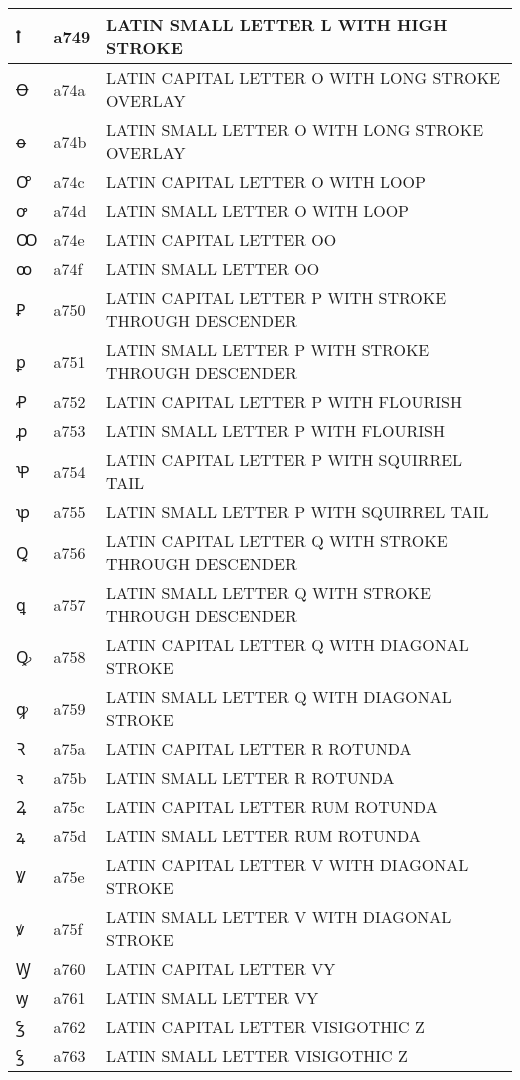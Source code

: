 \documentclass[12pt,letterpaper,openany]{book}
\begin{document}
\begin{center}
\begin{supertabular}{|m{0.25in}|m{0.5in}|m{4in}|}
ꝉ & a749 & LATIN SMALL LETTER L WITH HIGH STROKE\\\hline
Ꝋ & a74a & LATIN CAPITAL LETTER O WITH LONG STROKE OVERLAY\\\hline
ꝋ & a74b & LATIN SMALL LETTER O WITH LONG STROKE OVERLAY\\\hline
Ꝍ & a74c & LATIN CAPITAL LETTER O WITH LOOP\\\hline
ꝍ & a74d & LATIN SMALL LETTER O WITH LOOP\\\hline
Ꝏ & a74e & LATIN CAPITAL LETTER OO\\\hline
ꝏ & a74f & LATIN SMALL LETTER OO\\\hline
Ꝑ & a750 & LATIN CAPITAL LETTER P WITH STROKE THROUGH DESCENDER\\\hline
ꝑ & a751 & LATIN SMALL LETTER P WITH STROKE THROUGH DESCENDER\\\hline
Ꝓ & a752 & LATIN CAPITAL LETTER P WITH FLOURISH\\\hline
ꝓ & a753 & LATIN SMALL LETTER P WITH FLOURISH\\\hline
Ꝕ & a754 & LATIN CAPITAL LETTER P WITH SQUIRREL TAIL\\\hline
ꝕ & a755 & LATIN SMALL LETTER P WITH SQUIRREL TAIL\\\hline
Ꝗ & a756 & LATIN CAPITAL LETTER Q WITH STROKE THROUGH DESCENDER\\\hline
ꝗ & a757 & LATIN SMALL LETTER Q WITH STROKE THROUGH DESCENDER\\\hline
Ꝙ & a758 & LATIN CAPITAL LETTER Q WITH DIAGONAL STROKE\\\hline
ꝙ & a759 & LATIN SMALL LETTER Q WITH DIAGONAL STROKE\\\hline
Ꝛ & a75a & LATIN CAPITAL LETTER R ROTUNDA\\\hline
ꝛ & a75b & LATIN SMALL LETTER R ROTUNDA\\\hline
Ꝝ & a75c & LATIN CAPITAL LETTER RUM ROTUNDA\\\hline
ꝝ & a75d & LATIN SMALL LETTER RUM ROTUNDA\\\hline
Ꝟ & a75e & LATIN CAPITAL LETTER V WITH DIAGONAL STROKE\\\hline
ꝟ & a75f & LATIN SMALL LETTER V WITH DIAGONAL STROKE\\\hline
Ꝡ & a760 & LATIN CAPITAL LETTER VY\\\hline
ꝡ & a761 & LATIN SMALL LETTER VY\\\hline
Ꝣ & a762 & LATIN CAPITAL LETTER VISIGOTHIC Z\\\hline
ꝣ & a763 & LATIN SMALL LETTER VISIGOTHIC Z\\\hline

\end{supertabular}
\end{center}
\end{document}
